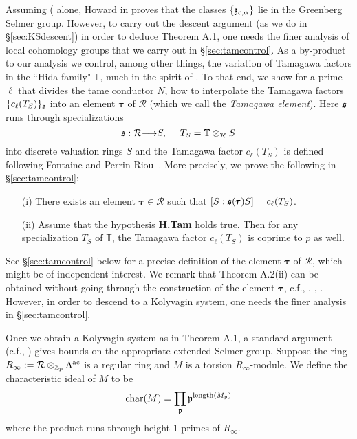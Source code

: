 \documentclass[12pt]{amsart}
\numberwithin{equation}{section}
\newcounter{Athm}[section]\setcounter{Athm}{1}
\newenvironment{Athm}{\par\medskip\noindent\refstepcounter{Athm}
\bgroup{\hspace*{-0.15 cm}\bf{Theorem}
A.{\arabic{Athm}}.}\bgroup\it}{\egroup \egroup\par\medskip}
\begin{document}
Assuming ({} alone, Howard in \cite[Theorem 2.4.5]{howard} proves that the classes $\{\frak{z}_{c,\alpha}\}$ lie in the Greenberg Selmer group. However, to carry out the descent argument (as we do in \S\ref{sec:KSdescent}) in order to deduce Theorem A.1, one needs the finer analysis of local cohomology groups that we carry out in \S\ref{sec:tamcontrol}. As a by-product to our analysis we control, among other things, the variation of Tamagawa factors in the ``Hida family"  ${\mathbb{T}}$, much in the spirit of \cite{emertonpollackweston}. To that end, we show for a prime $\ell$ that divides the tame conductor $N$, how to interpolate the Tamagawa factors $\{c_\ell(T_S)\}_{\frak{s}}$ into an element $\pmb{\tau}$ of $\mathcal{R}$ (which we call the \emph{Tamagawa element}). Here $\frak{s}$ runs
through specializations $$\frak{s}: \mathcal{R} {\longrightarrow} S,\,\,\,\,\,\,\,\, T_S={\mathbb{T}}\otimes_{\mathcal{R}}S$$
into discrete valuation rings $S$ and the Tamagawa factor $c_\ell(T_S)$ is defined following Fontaine and Perrin-Riou~\cite{FPR91}.  More precisely, we prove the following in \S\ref{sec:tamcontrol}:

\begin{Athm}
\label{thm:tamvariation}
\begin{itemize}
\item[(i)] There exists an element $\pmb{\tau} \in {\mathcal{R}}$ such that $[S:\frak{s}(\pmb{\tau})S]=c_\ell(T_S)$.
\item[(ii)] Assume that the hypothesis {\upshape\textbf{H.Tam}} holds true. Then for any specialization $T_S$ of ${\mathbb{T}}$, the Tamagawa factor $c_\ell(T_S)$ is coprime to $p$ as well.
\end{itemize}
\end{Athm}

See \S\ref{sec:tamcontrol} below for a precise definition of the element $\pmb{\tau}$ of ${\mathcal{R}}$, which might be of independent interest. We remark that Theorem A.2(ii) can be obtained without going through the construction of the element $\pmb{\tau}$, c.f., \cite[Propositions 2.2.4 and 2.2.5]{emertonpollackweston}, \cite[Theorem 3.3]{ochiai06}, \cite[Lemma 2.14]{fochiai}. However, in order to descend to a Kolyvagin system, one needs the finer analysis in \S\ref{sec:tamcontrol}.

Once we obtain a Kolyvagin system as in Theorem A.1, a standard argument
(c.f., \cite{o, fouquetRIMS}) gives
bounds on the appropriate extended Selmer group. Suppose the ring $R_\infty:={\mathcal{R}}\otimes_{{\mathbb{Z}}_p}{\Lambda}^{\textup{ac}}$ is a regular ring and $M$ is a torsion $R_\infty$-module. We define the characteristic ideal of $M$ to be
$$\textup{char}(M)=\prod_{\frak{p}}\frak{p}^{\textup{length}(M_{\frak{p}})}$$
where the product runs through height-1 primes of $R_\infty$.
\end{document}
